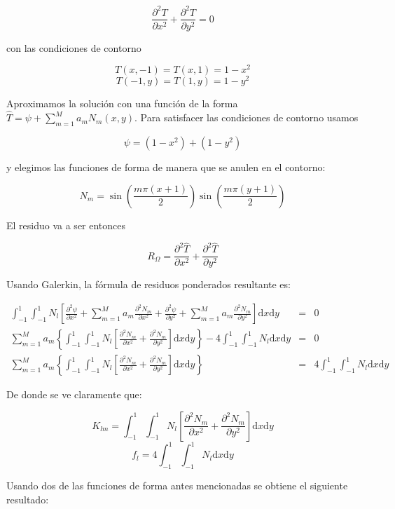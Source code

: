 \documentclass{article}
\def\intone{\int_{-1}^1}
\def\dx{\mbox{d}x}
\def\dy{\mbox{d}y}
\def\summ{\sum_{m=1}^M}
\begin{document}
\begin{enumerate}[1)]
{        \[ \frac{\partial^2 T}{\partial x^2} + \frac{\partial^2 T}{\partial y^2} = 0 \]

        con las condiciones de contorno

        \[ T(x, -1) = T(x, 1) = 1 - x^2 \]
        \[ T(-1, y) = T(1, y) = 1 - y^2 \]

        Aproximamos la solución con una función de la forma 
        $\hat{T} = \psi + \sum_{m=1}^M a_m N_m(x, y)$. Para satisfacer las condiciones 
        de contorno usamos

        \[ \psi = (1-x^2) + (1-y^2) \]

        y elegimos las funciones de forma de manera que se anulen en el contorno:

        \[ N_m = \sin\left(\frac{m \pi (x+1)}{2}\right) \sin\left(\frac{m \pi (y+1)}{2}\right) \]

        El residuo va a ser entonces

        \[ R_\Omega = \frac{\partial^2 \hat{T}}{\partial x^2} 
                      + \frac{\partial^2 \hat{T}}{\partial y^2} \]

        Usando Galerkin, la fórmula de residuos ponderados resultante es:

        \begin{eqnarray*}
        \intone\intone N_l \left[ \frac{\partial^2 \psi}{\partial x^2} 
        + \summ a_m \frac{\partial^2 N_m}{\partial x^2} 
        + \frac{\partial^2 \psi}{\partial y^2} 
        + \summ a_m \frac{\partial^2 N_m}{\partial y^2}\right] \dx\dy &=& 0 \\
        \summ a_m \left\{\intone\intone N_l \left[ \frac{\partial^2 N_m}{\partial x^2}
        + \frac{\partial^2 N_m}{\partial y^2}\right] \dx\dy  \right\}
        - 4 \intone\intone N_l \dx\dy &=& 0 \\
        \summ a_m \left\{\intone\intone N_l \left[ \frac{\partial^2 N_m}{\partial x^2}
        + \frac{\partial^2 N_m}{\partial y^2}\right] \dx\dy  \right\}
        &=& 4 \intone\intone N_l \dx\dy
        \end{eqnarray*}

        De donde se ve claramente que:

        \[ K_{lm} = \intone\intone N_l \left[ \frac{\partial^2 N_m}{\partial x^2}
        + \frac{\partial^2 N_m}{\partial y^2}\right] \dx\dy \]
        \[ f_l = 4 \intone\intone N_l \dx\dy \]

        Usando dos de las funciones de forma antes mencionadas se obtiene el siguiente
        resultado: 

}
\end{enumerate}
\end{document}
